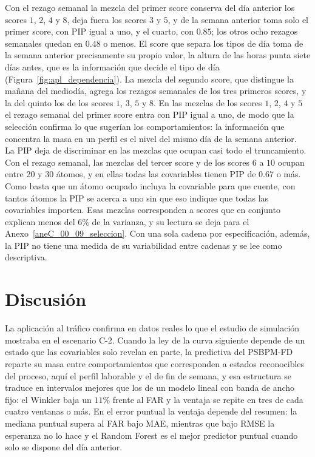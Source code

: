 Con el rezago semanal la mezcla del primer score conserva del día anterior los scores $1$, $2$, $4$ y $8$, deja fuera los scores $3$ y $5$, y de la semana anterior toma solo el primer score, con PIP igual a uno, y el cuarto, con $0.85$; los otros ocho rezagos semanales quedan en $0.48$ o menos. El score que separa los tipos de día toma de la semana anterior precisamente su propio valor, la altura de las horas punta siete días antes, que es la información que decide el tipo de día (Figura~\ref{fig:apl_dependencia}). La mezcla del segundo score, que distingue la mañana del mediodía, agrega los rezagos semanales de los tres primeros scores, y la del quinto los de los scores $1$, $3$, $5$ y $8$. En las mezclas de los scores $1$, $2$, $4$ y $5$ el rezago semanal del primer score entra con PIP igual a uno, de modo que la selección confirma lo que sugerían los comportamientos: la información que concentra la masa en un perfil es el nivel del mismo día de la semana anterior.\\

La PIP deja de discriminar en las mezclas que ocupan casi todo el truncamiento. Con el rezago semanal, las mezclas del tercer score y de los scores $6$ a $10$ ocupan entre 20 y 30 átomos, y en ellas todas las covariables tienen PIP de $0.67$ o más. Como basta que un átomo ocupado incluya la covariable para que cuente, con tantos átomos la PIP se acerca a uno sin que eso indique que todas las covariables importen. Esas mezclas corresponden a scores que en conjunto explican menos del $6\%$ de la varianza, y su lectura se deja para el Anexo~\ref{aneC_00_09_seleccion}. Con una sola cadena por especificación, además, la PIP no tiene una medida de su variabilidad entre cadenas y se lee como descriptiva.

\section{Discusión}
\label{04_04_00_discusion}

La aplicación al tráfico confirma en datos reales lo que el estudio de simulación mostraba en el escenario C-2. Cuando la ley de la curva siguiente depende de un estado que las covariables solo revelan en parte, la predictiva del PSBPM-FD reparte su masa entre comportamientos que corresponden a estados reconocibles del proceso, aquí el perfil laborable y el de fin de semana, y esa estructura se traduce en intervalos mejores que los de un modelo lineal con banda de ancho fijo: el Winkler baja un $11\%$ frente al FAR y la ventaja se repite en tres de cada cuatro ventanas o más. En el error puntual la ventaja depende del resumen: la mediana puntual supera al FAR bajo MAE, mientras que bajo RMSE la esperanza no lo hace y el Random Forest es el mejor predictor puntual cuando solo se dispone del día anterior.\\

